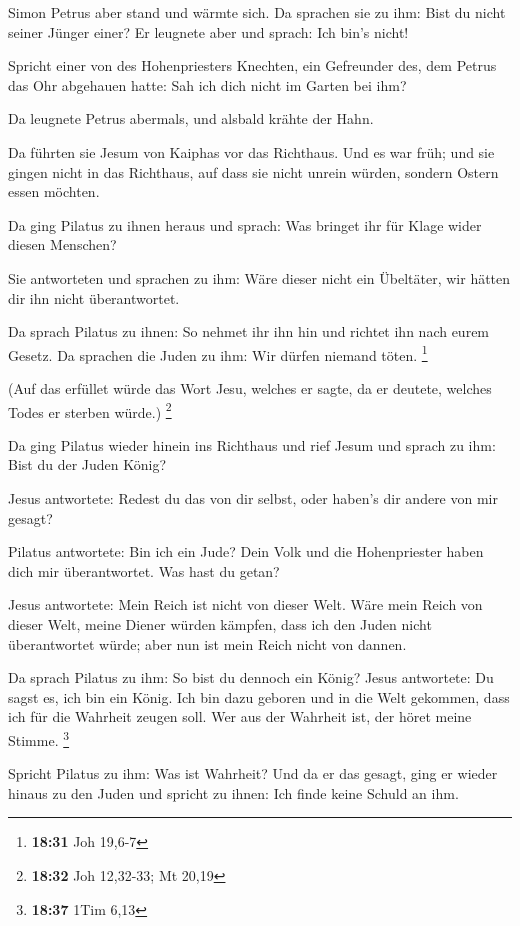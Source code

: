  Simon Petrus aber stand und wärmte sich. Da sprachen sie
zu ihm: Bist du nicht seiner Jünger einer? Er leugnete aber und sprach:
Ich bin's nicht!

 Spricht einer von des Hohenpriesters Knechten, ein
Gefreunder des, dem Petrus das Ohr abgehauen hatte: Sah ich dich nicht
im Garten bei ihm?

 Da leugnete Petrus abermals, und alsbald krähte der Hahn.

 Da führten sie Jesum von Kaiphas vor das Richthaus. Und es
war früh; und sie gingen nicht in das Richthaus, auf dass sie nicht
unrein würden, sondern Ostern essen möchten.

 Da ging Pilatus zu ihnen heraus und sprach: Was bringet
ihr für Klage wider diesen Menschen?

 Sie antworteten und sprachen zu ihm: Wäre dieser nicht ein
Übeltäter, wir hätten dir ihn nicht überantwortet.

 Da sprach Pilatus zu ihnen: So nehmet ihr ihn hin und
richtet ihn nach eurem Gesetz. Da sprachen die Juden zu ihm: Wir dürfen
niemand töten. \footnote{\textbf{18:31} Joh 19,6-7}

 (Auf das erfüllet würde das Wort Jesu, welches er sagte,
da er deutete, welches Todes er sterben würde.) \footnote{\textbf{18:32}
  Joh 12,32-33; Mt 20,19}

 Da ging Pilatus wieder hinein ins Richthaus und rief Jesum
und sprach zu ihm: Bist du der Juden König?

 Jesus antwortete: Redest du das von dir selbst, oder
haben's dir andere von mir gesagt?

 Pilatus antwortete: Bin ich ein Jude? Dein Volk und die
Hohenpriester haben dich mir überantwortet. Was hast du getan?

 Jesus antwortete: Mein Reich ist nicht von dieser Welt.
Wäre mein Reich von dieser Welt, meine Diener würden kämpfen, dass ich
den Juden nicht überantwortet würde; aber nun ist mein Reich nicht von
dannen.

 Da sprach Pilatus zu ihm: So bist du dennoch ein König?
Jesus antwortete: Du sagst es, ich bin ein König. Ich bin dazu geboren
und in die Welt gekommen, dass ich für die Wahrheit zeugen soll. Wer aus
der Wahrheit ist, der höret meine Stimme. \footnote{\textbf{18:37} 1Tim
  6,13}

 Spricht Pilatus zu ihm: Was ist Wahrheit? Und da er das
gesagt, ging er wieder hinaus zu den Juden und spricht zu ihnen: Ich
finde keine Schuld an ihm.

